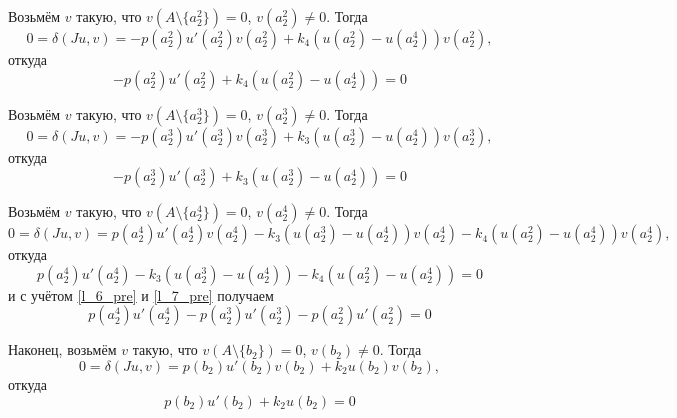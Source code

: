 \documentclass[a4paper,12pt]{article} %
\begin{document}
Возьмём $v$ такую, что $v(A \setminus \{a_2^2\}) = 0$, $v(a_2^2) \neq 0$.
Тогда
\begin{equation*}
	0 = \delta(Ju, v) =
	- p(a_2^2) u'(a_2^2) v(a_2^2)
	+ k_4 (u(a_2^2) - u(a_2^4)) v(a_2^2)
	,
\end{equation*}
откуда
\begin{equation}\label{l_6_pre}
	- p(a_2^2) u'(a_2^2) + k_4 (u(a_2^2) - u(a_2^4)) = 0
\end{equation}


Возьмём $v$ такую, что $v(A \setminus \{a_2^3\}) = 0$, $v(a_2^3) \neq 0$.
Тогда
\begin{equation*}
	0 = \delta(Ju, v) =
	                              - p(a_2^3) u'(a_2^3) v(a_2^3)
	+ k_3 (u(a_2^3) - u(a_2^4)) v(a_2^3)
	,
\end{equation*}
откуда
\begin{equation}\label{l_7_pre}
	- p(a_2^3) u'(a_2^3) + k_3 (u(a_2^3) - u(a_2^4)) = 0
\end{equation}



Возьмём $v$ такую, что $v(A \setminus \{a_2^4\}) = 0$, $v(a_2^4) \neq 0$.
Тогда
\begin{equation*}
	0 = \delta(Ju, v) =
	  p(a_2^4) u'(a_2^4) v(a_2^4)
	- k_3 (u(a_2^3) - u(a_2^4))  v(a_2^4)
	- k_4 (u(a_2^2) - u(a_2^4))  v(a_2^4)
	,
\end{equation*}
откуда
\begin{equation}
	p(a_2^4) u'(a_2^4) - k_3 (u(a_2^3) - u(a_2^4)) - k_4 (u(a_2^2) - u(a_2^4)) = 0
\end{equation}
и с учётом \eqref{l_6_pre} и \eqref{l_7_pre} получаем
\begin{equation}
	p(a_2^4) u'(a_2^4) - p(a_2^3) u'(a_2^3) - p(a_2^2) u'(a_2^2) = 0
\end{equation}


Наконец, возьмём $v$ такую, что $v(A \setminus \{b_2\}) = 0$, $v(b_2) \neq 0$.
Тогда
\begin{equation*}
	0 = \delta(Ju, v) =
	  p(b_2  ) u'(b_2  ) v(b_2  )
	+ k_2  u(b_2  ) v(b_2  )
	,
\end{equation*}
откуда
\begin{equation}
	p(b_2  ) u'(b_2  ) + k_2  u(b_2  ) = 0
\end{equation}
\end{document}
